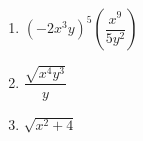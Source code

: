\begin{enumerate}
\begin{enumerate}
\item $\left(-2x^3y\right)^5 \left(\dfrac{x^9}{5y^2}\right)$

  \vfill

\item $\dfrac{\sqrt{x^4y^3}}{y}$

  \vfill

\item $\sqrt{x^2+4}$

  \vfill

\end{enumerate}


%
%
%
%

\end{enumerate}
